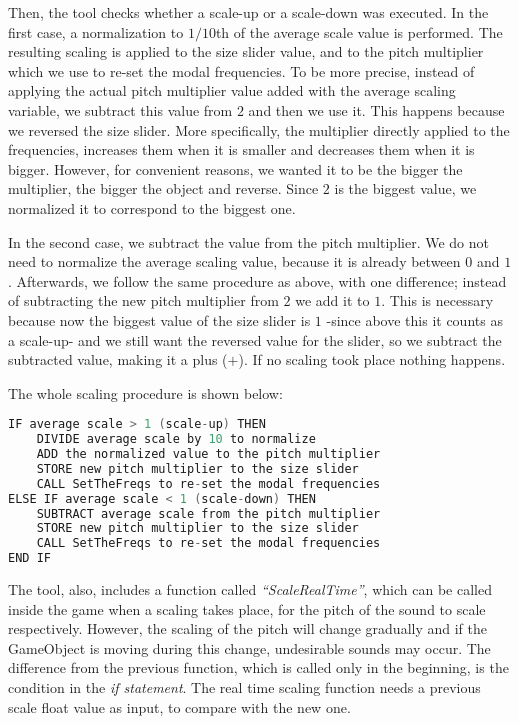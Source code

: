 Then, the tool checks whether a scale-up or a scale-down was executed. In the first case, a normalization to $1/10$th of the average scale value is performed. The resulting scaling is applied to the size slider value, and to the pitch multiplier which we use to re-set the modal frequencies. To be more precise, instead of applying the actual pitch multiplier value added with the average scaling variable, we subtract this value from $2$ and then we use it. This happens because we reversed the size slider. More specifically, the multiplier directly applied to the frequencies, increases them when it is smaller and decreases them when it is bigger. However, for convenient reasons, we wanted it to be the bigger the multiplier, the bigger the object and reverse. Since $2$ is the biggest value, we normalized it to correspond to the biggest one.

In the second case, we subtract the value from the pitch multiplier. We do not need to normalize the average scaling value, because it is already between $0$ and $1$. Afterwards, we follow the same procedure as above, with one difference; instead of subtracting the new pitch multiplier from $2$ we add it to $1$. This is necessary because now the biggest value of the size slider is $1$ -since above this it counts as a scale-up- and we still want the reversed value for the slider, so we subtract the subtracted value, making it a plus ($+$). If no scaling took place nothing happens.

The whole scaling procedure is shown below:

\begin{lstlisting}[caption={Code for audio adjusting to object scaling},label={lst:scale},language=C]
IF average scale > 1 (scale-up) THEN
    DIVIDE average scale by 10 to normalize
    ADD the normalized value to the pitch multiplier
    STORE new pitch multiplier to the size slider
    CALL SetTheFreqs to re-set the modal frequencies
ELSE IF average scale < 1 (scale-down) THEN
    SUBTRACT average scale from the pitch multiplier
    STORE new pitch multiplier to the size slider
    CALL SetTheFreqs to re-set the modal frequencies
END IF
\end{lstlisting}\label{code:scale}

The tool, also, includes a function called \textit{``ScaleRealTime''}, which can be called inside the game when a scaling takes place, for the pitch of the sound to scale respectively. However, the scaling of the pitch will change gradually and if the GameObject is moving during this change, undesirable sounds may occur. The difference from the previous function, which is called only in the beginning, is the condition in the \textit{if statement}. The real time scaling function needs a previous scale float value as input, to compare with the new one.

